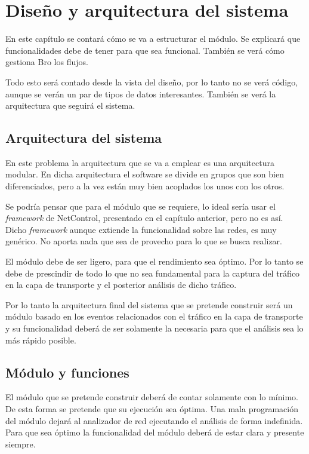 \chapter{Diseño y arquitectura del sistema}

En este capítulo se contará cómo se va a estructurar el módulo. Se explicará que funcionalidades debe de tener para que sea funcional. También se verá cómo gestiona Bro los flujos. 

\intro Todo esto será contado desde la vista del diseño, por lo tanto no se verá código, aunque se verán un par de tipos de datos interesantes. También se verá la arquitectura que seguirá el sistema.

\section{Arquitectura del sistema}

En este problema la arquitectura que se va a emplear es una arquitectura modular. En dicha arquitectura el software 
se divide en grupos que son bien diferenciados, pero a la vez están muy bien acoplados los unos con los otros.

\intro Se podría pensar que para el módulo que se requiere, lo ideal sería usar el \textit{framework} de NetControl, presentado en el capítulo anterior, pero no es así. Dicho \textit{framework} aunque extiende la funcionalidad sobre las redes, es muy genérico. No aporta nada que sea de provecho para lo que se busca realizar.

\intro El módulo debe de ser ligero, para que el rendimiento sea óptimo. Por lo tanto se debe de prescindir de todo lo que no sea fundamental para la captura del tráfico en la capa de transporte y el posterior análisis de dicho tráfico.

\intro Por lo tanto la arquitectura final del sistema que se pretende construir será un módulo basado en los eventos relacionados con el tráfico en la capa de transporte y su funcionalidad deberá de ser solamente la necesaria para que el análisis sea lo más rápido posible. 

\section{Módulo y funciones}

El módulo que se pretende construir deberá de contar solamente con lo mínimo. De esta forma se pretende que su 
ejecución sea óptima. Una mala programación del módulo dejará al analizador de red ejecutando el análisis de forma 
indefinida. Para que sea óptimo la funcionalidad del módulo deberá de estar clara y presente siempre.

